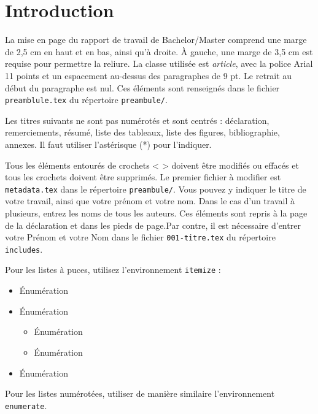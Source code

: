 

\section{Introduction}

La mise en page du rapport de travail de Bachelor/Master comprend une marge de 2,5 cm en haut et en bas, ainsi qu’à droite. À gauche, une marge de 3,5 cm est requise pour permettre la reliure. La classe utilisée est \emph{article}, avec la police Arial 11 points et un espacement au-dessus des paragraphes de 9 pt. Le retrait au début du paragraphe est nul. Ces éléments sont renseignés dans le fichier \texttt{preamblule.tex} du répertoire \texttt{preambule/}.

Les titres suivants ne sont pas numérotés et sont centrés : déclaration, remerciements, résumé, liste des tableaux, liste des figures, bibliographie, annexes. Il faut utiliser l'astérisque (*) pour l'indiquer.

Tous les éléments entourés de crochets < > doivent être modifiés ou effacés et tous les crochets doivent être supprimés. Le premier fichier à modifier est \texttt{metadata.tex} dans le répertoire \texttt{preambule/}. Vous pouvez y indiquer le titre de votre travail, ainsi que votre prénom et votre nom. Dans le cas d'un travail à plusieurs, entrez les noms de tous les auteurs. Ces éléments sont repris à la page de la déclaration et dans les pieds de page.Par contre, il est nécessaire d'entrer votre Prénom et votre Nom dans le fichier \texttt{001-titre.tex} du répertoire \texttt{includes}.

Pour les listes à puces, utilisez l'environnement \texttt{itemize} :

\begin{itemize}[itemsep=0pt]
	\item Énumération
	\item Énumération
	\begin{itemize}[itemsep=0pt]
		\item Énumération
		\item Énumération
	\end{itemize}
	\item Énumération
\end{itemize}

Pour les listes numérotées, utiliser de manière similaire l'environnement \texttt{enumerate}.

